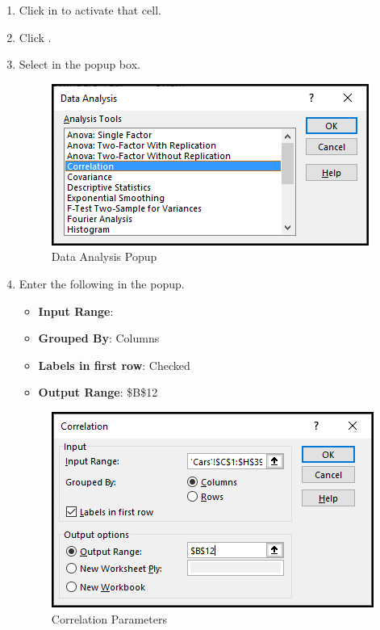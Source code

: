 \begin{enumerate}[resume]

	\item Click in  to activate that cell.
	\item Click .
	\item Select  in the  popup box.
	
	\begin{figure}[H]
		\centering
		\includegraphics[width=\maxwidth{.95\linewidth}]{gfx/ch09_fig73}
		\caption{Data Analysis Popup}
		\label{09:fig73}
	\end{figure}
	
	\item Enter the following in the  popup.
	
	\begin{itemize}
		\item \textbf{Input Range}: 
		\item \textbf{Grouped By}: Columns
		\item \textbf{Labels in first row}: Checked
		\item \textbf{Output Range}: \$B\$12
	\end{itemize}

	\begin{figure}[H]
		\centering
		\includegraphics[width=\maxwidth{.95\linewidth}]{gfx/ch09_fig74}
		\caption{Correlation Parameters}
		\label{09:fig74}
	\end{figure}
	

\end{enumerate}
